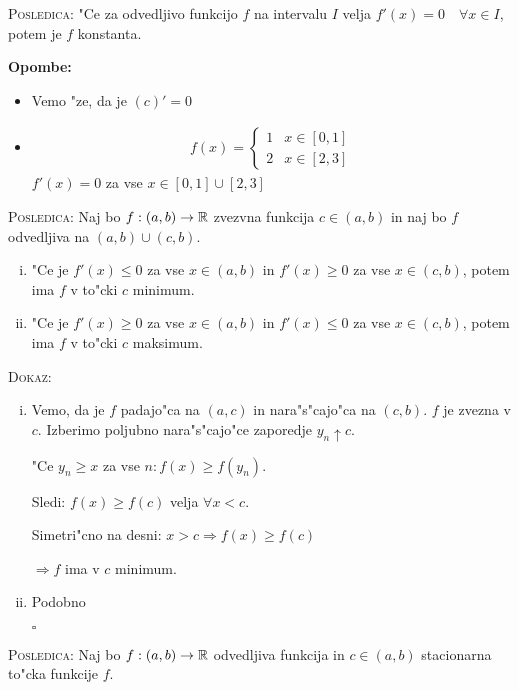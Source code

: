 \textsc{Posledica:} "Ce za odvedljivo funkcijo $f$ na intervalu $I$ velja $f'(x) = 0 \quad \forall x \in I$, potem je $f$ konstanta.

\textbf{Opombe:}
\begin{itemize}
	\item Vemo "ze, da je $(c)' = 0$
	\item \begin{gather*}
		f(x) = \begin{cases}
		1 & x \in [0, 1] \\
		2 & x \in [2, 3]
		\end{cases}
	\end{gather*}
	$f'(x) = 0$ za vse $x \in [0, 1] \cup [2, 3]$
\end{itemize}
%
\textsc{Posledica:} Naj bo $f: (a, b) \to \mathbb{R}$ zvezvna funkcija $c \in (a, b)$ in naj bo $f$ odvedljiva na $(a, b) \cup (c, b)$.
\begin{enumerate}[(i)]
	\item "Ce je $f'(x) \leq 0$ za vse $x \in (a, b)$ in $f'(x) \geq 0$ za vse $x \in (c, b)$, potem ima $f$ v to"cki $c$ minimum.
	\item "Ce je $f'(x) \geq 0$ za vse $x \in (a, b)$ in $f'(x) \leq 0$ za vse $x \in (c, b)$, potem ima $f$ v to"cki $c$ maksimum.
\end{enumerate}
\textsc{Dokaz:}
\begin{enumerate}[(i)]
	\item Vemo, da je $f$ padajo"ca na $(a, c)$ in nara"s"cajo"ca na $(c, b)$. $f$ je zvezna v $c$. Izberimo poljubno nara"s"cajo"ce zaporedje $y_n \uparrow c$.
	
	"Ce $y_n \geq x$ za vse $n: f(x) \geq f(y_n)$. 
	
	Sledi: $f(x) \geq f(c)$ velja $\forall x < c$.	
	
	Simetri"cno na desni: $x > c \Rightarrow f(x) \geq f(c)$
	
	$\Rightarrow f$ ima v $c$ minimum.
	
	\item Podobno
	
	\hfill $\square$
\end{enumerate}
\textsc{Posledica:} Naj bo $f: (a, b) \to \mathbb{R}$ odvedljiva funkcija in $c \in (a, b)$ stacionarna to"cka funkcije $f$.
